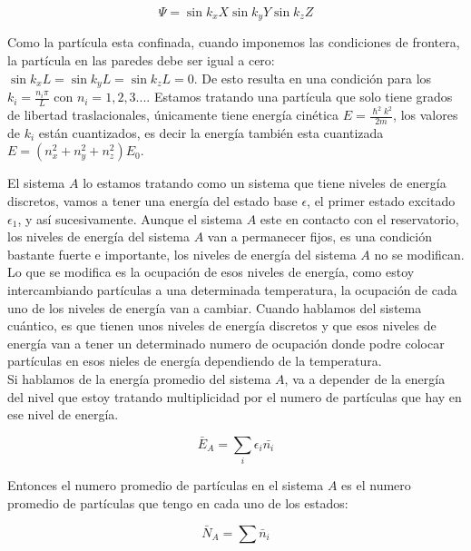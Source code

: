 \documentclass[11pt,fleqn]{book}
\begin{document}

\begin{equation*}
    \Psi=\sin{k_{x}X}\sin{k_{y}Y}\sin{k_{z}Z}
\end{equation*}

Como la partícula esta confinada, cuando imponemos las condiciones de frontera, la partícula en las paredes debe ser igual a cero: $\sin{k_{x}L}=\sin{k_{y}L}=\sin{k_{z}L}=0$. De esto resulta en una condición para los $k_{i}=\frac{n_{i}\pi}{L}$ con $n_{i}=1, 2, 3...$. Estamos tratando una partícula que solo tiene grados de libertad traslacionales, únicamente tiene energía cinética $E=\frac{\hslash^{2}k^{2}}{2m}$, los valores de $k_{i}$ están cuantizados, es decir la energía también esta cuantizada $E=(n_{x}^{2}+n_{y}^{2}+n_{z}^{2})E_{0}$. 

El sistema $A$ lo estamos tratando como un sistema que tiene niveles de energía discretos, vamos a tener una energía del estado base $\epsilon$, el primer estado excitado $\epsilon_{1}$, y así sucesivamente. Aunque el sistema $A$ este en contacto con el reservatorio, los niveles de energía del sistema $A$ van a permanecer fijos, es una condición bastante fuerte e importante, los niveles de energía del sistema $A$ no se modifican. Lo que se modifica es la ocupación de esos niveles de energía, como estoy intercambiando partículas a una determinada temperatura, la ocupación de cada uno de los niveles de energía van a cambiar. Cuando hablamos del sistema cuántico, es que tienen unos niveles de energía discretos y que esos niveles de energía van a tener un determinado numero de ocupación donde podre colocar partículas en esos nieles de energía dependiendo de la temperatura.\\

Si hablamos de la energía promedio del sistema $A$, va a depender de la energía del nivel que estoy tratando multiplicidad por el numero de partículas que hay en ese nivel de energía.

\begin{equation}
    \bar{E}_{A}=\sum_{i}\epsilon_{i}\bar{n_{i}}
\end{equation}

Entonces el numero promedio de partículas en el sistema $A$ es el numero promedio de partículas que tengo en cada uno de los estados:

\begin{equation}
    \bar{N}_{A}=\sum\bar{n}_{i}
\end{equation}
\end{document}
